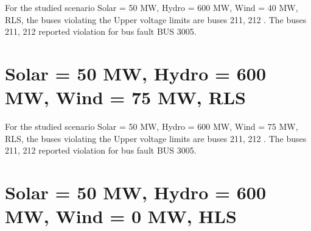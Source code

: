 \documentclass[10pt]{report}
\begin{document}
For the studied scenario Solar = 50 MW, Hydro = 600 MW, Wind = 40 MW, RLS, the buses violating the Upper voltage limits are buses 211, 212 .
The buses 211, 212 reported violation for bus fault BUS 3005.
\begin{table}[H]
\caption{Contingencies reporting bus voltages greater than emergency voltage of 1.1 PU for scenario Solar = 50 MW, Hydro = 600 MW, Wind = 40 MW, RLS}
\label{HVSolar50MWHydro600MWWind40MWRLS}
\centering
{}
\end{table}

\section{Solar = 50 MW, Hydro = 600 MW, Wind = 75 MW, RLS}

For the studied scenario Solar = 50 MW, Hydro = 600 MW, Wind = 75 MW, RLS, the buses violating the Upper voltage limits are buses 211, 212 .
The buses 211, 212 reported violation for bus fault BUS 3005.
\begin{table}[H]
\caption{Contingencies reporting bus voltages greater than emergency voltage of 1.1 PU for scenario Solar = 50 MW, Hydro = 600 MW, Wind = 75 MW, RLS}
\label{HVSolar50MWHydro600MWWind75MWRLS}
\centering
{}
\end{table}

\section{Solar = 50 MW, Hydro = 600 MW, Wind = 0 MW, HLS}
\end{document}
